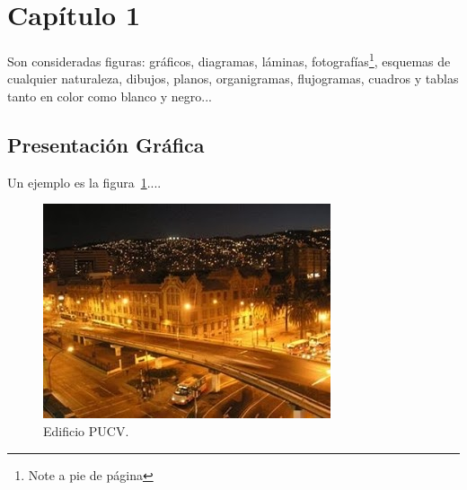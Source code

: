 \section{Capítulo 1}

Son consideradas figuras: gráficos, diagramas, láminas, fotografías\footnote{Note a pie de página},
esquemas de cualquier naturaleza, dibujos, planos, organigramas, flujogramas,
cuadros y tablas tanto en color como blanco y negro...

\subsection{Presentación Gráfica}
       
Un ejemplo es la figura~\ref{fig:pucv}....

\begin{figure}[H]
    \begin{center}
        \includegraphics[width=0.6\linewidth]{Capitulo_1/imagenes/pucv.jpg} 
        \caption{Edificio PUCV.}\label{fig:pucv}
    \end{center}
\end{figure}